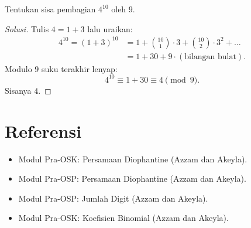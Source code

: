 \documentclass[12pt]{scrartcl}
\begin{document}
\begin{example}
Tentukan sisa pembagian $4^{10}$ oleh $9$.
\end{example}
\begin{proof}[Solusi]
Tulis $4 = 1 + 3$ lalu uraikan:
\begin{align*}
4^{10} = (1 + 3)^{10} &= 1 + \binom{10}{1} \cdot 3 + \binom{10}{2} \cdot 3^2 + \dots \\
&= 1 + 30 + 9 \cdot (\text{bilangan bulat}).
\end{align*}
Modulo $9$ suku terakhir lenyap:
\[ 4^{10} \equiv 1 + 30 \equiv 4 \pmod{9}. \]
Sisanya $4$.
\end{proof}

\section{Referensi}
\begin{itemize}
    \item Modul Pra-OSK: Persamaan Diophantine (Azzam dan Akeyla).
    \item Modul Pra-OSP: Persamaan Diophantine (Azzam dan Akeyla).
    \item Modul Pra-OSP: Jumlah Digit (Azzam dan Akeyla).
    \item Modul Pra-OSK: Koefisien Binomial (Azzam dan Akeyla).
\end{itemize}
\end{document}

